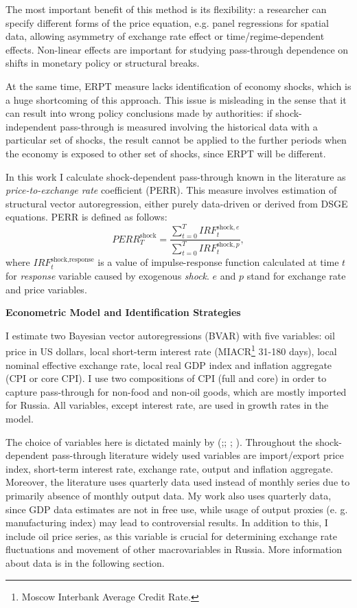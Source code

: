 \documentclass[12pt, a4paper]{extarticle}
\begin{document}
The most important benefit of this method is its flexibility: a researcher can specify different forms of the price equation, e.g. panel regressions for spatial data, allowing asymmetry of exchange rate effect or time/regime-dependent effects. Non-linear effects are important for studying pass-through dependence on shifts in monetary policy or structural breaks. 

At the same time, ERPT measure lacks identification of economy shocks, which is a huge shortcoming of this approach. This issue is misleading in the sense that it can result into wrong policy conclusions made by authorities: if shock-independent pass-through is measured involving the historical data with a particular set of shocks, the result cannot be applied to the further periods when the economy is exposed to other set of shocks, since ERPT will be different.

In this work I calculate shock-dependent pass-through known in the literature as \textit{price-to-exchange rate} coefficient (PERR). This measure involves estimation of structural vector autoregression, either purely data-driven or derived from DSGE equations. PERR is defined as follows:
\begin{equation}
	PERR^{\text{shock}}_{T} = \frac{\sum_{t=0}^{T}IRF^{\text{shock}, e}_{t}}{\sum_{t=0}^{T}IRF_{t}^{\text{shock}, p}},
\end{equation}
where $IRF^{\text{shock}, \text{response}}_{t}$ is a value of impulse-response function calculated at time $t$ for \textit{response} variable caused by exogenous \textit{shock}. $e$ and $p$ stand for exchange rate and price variables.

\begin{center}
	\textbf{Econometric Model and Identification Strategies}
\end{center}

I estimate two Bayesian vector autoregressions (BVAR) with five variables: oil price in US dollars, local short-term interest rate (MIACR\footnote{Moscow Interbank Average Credit Rate.} 31-180 days), local nominal effective exchange rate, local real GDP index and inflation aggregate (CPI or core CPI). I use two compositions of CPI (full and core) in order to capture pass-through for non-food and non-oil goods, which are mostly imported for Russia. All variables, except interest rate, are used in growth rates in the model.

The choice of variables here is dictated mainly by (\cite{Hahn2003};\cite{Comunale2017}; \cite{Forbes2018}; \cite{LeivaLeon2019}). Throughout the shock-dependent pass-through literature widely used variables are import/export price index, short-term interest rate, exchange rate, output and inflation aggregate. Moreover, the literature uses quarterly data used instead of monthly series due to primarily absence of monthly output data. My work also uses quarterly data, since GDP data estimates are not in free use, while usage of output proxies (e. g. manufacturing index) may lead to controversial results. In addition to this, I include oil price series, as this variable is crucial for determining exchange rate fluctuations and movement of other macrovariables in Russia. More information about data is in the following section.
\end{document}
